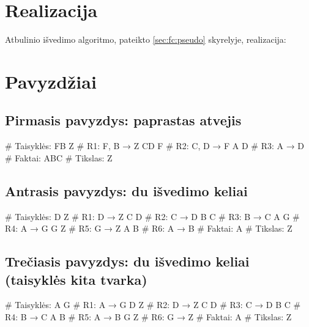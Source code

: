 \section{Realizacija}

Atbulinio išvedimo algoritmo, pateikto \ref{sec:fc:pseudo}
skyrelyje, realizacija:


\section{Pavyzdžiai}

\subsection{Pirmasis pavyzdys: paprastas atvejis}

\begin{pythonaienv}[bc]
# Taisyklės:
FB Z                                    # R1: F, B → Z
CD F                                    # R2: C, D → F
A D                                     # R3: A → D
# Faktai:
ABC
# Tikslas:
Z
\end{pythonaienv}

\subsection{Antrasis pavyzdys: du išvedimo keliai}

\begin{pythonaienv}[bc]
# Taisyklės:
D Z                                     # R1: D → Z
C D                                     # R2: C → D
B C                                     # R3: B → C
A G                                     # R4: A → G
G Z                                     # R5: G → Z
A B                                     # R6: A → B
# Faktai:
A
# Tikslas:
Z
\end{pythonaienv}

\subsection{Trečiasis pavyzdys: du išvedimo keliai (taisyklės kita tvarka)}

\begin{pythonaienv}[bc]
# Taisyklės:
A G                                     # R1: A → G
D Z                                     # R2: D → Z
C D                                     # R3: C → D
B C                                     # R4: B → C
A B                                     # R5: A → B
G Z                                     # R6: G → Z
# Faktai:
A
# Tikslas:
Z
\end{pythonaienv}

